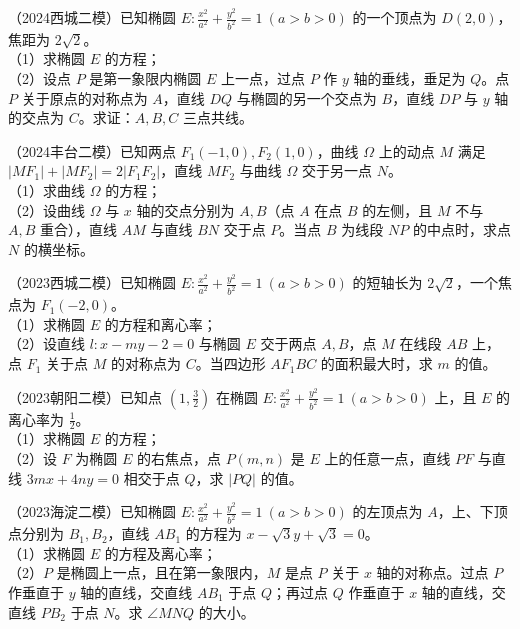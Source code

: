 \begin{example} %
（2024西城二模）已知椭圆 $E:\frac{x^2}{a^2}+\frac{y^2}{b^2}=1\ (a>b>0)$ 的一个顶点为 $D(2,0)$，焦距为 $2\sqrt{2}$。\\
（1）求椭圆 $E$ 的方程；\\
（2）设点 $P$ 是第一象限内椭圆 $E$ 上一点，过点 $P$ 作 $y$ 轴的垂线，垂足为 $Q$。点 $P$ 关于原点的对称点为 $A$，直线 $DQ$ 与椭圆的另一个交点为 $B$，直线 $DP$ 与 $y$ 轴的交点为 $C$。求证：$A,B,C$ 三点共线。
\end{example}

\begin{example} %
（2024丰台二模）已知两点 $F_1(-1,0),F_2(1,0)$，曲线 $\Omega$ 上的动点 $M$ 满足 $\lvert MF_1\rvert+\lvert MF_2\rvert=2\lvert F_1F_2\rvert$，直线 $MF_2$ 与曲线 $\Omega$ 交于另一点 $N$。\\
（1）求曲线 $\Omega$ 的方程；\\
（2）设曲线 $\Omega$ 与 $x$ 轴的交点分别为 $A,B$（点 $A$ 在点 $B$ 的左侧，且 $M$ 不与 $A,B$ 重合），直线 $AM$ 与直线 $BN$ 交于点 $P$。当点 $B$ 为线段 $NP$ 的中点时，求点 $N$ 的横坐标。
\end{example}

\begin{example} %
（2023西城二模）已知椭圆 $E:\frac{x^2}{a^2}+\frac{y^2}{b^2}=1\ (a>b>0)$ 的短轴长为 $2\sqrt{2}$，一个焦点为 $F_1(-2,0)$。\\
（1）求椭圆 $E$ 的方程和离心率；\\
（2）设直线 $l:x-my-2=0$ 与椭圆 $E$ 交于两点 $A,B$，点 $M$ 在线段 $AB$ 上，点 $F_1$ 关于点 $M$ 的对称点为 $C$。当四边形 $AF_1BC$ 的面积最大时，求 $m$ 的值。
\end{example}

\begin{example} %
（2023朝阳二模）已知点 $\left(1,\frac{3}{2}\right)$ 在椭圆 $E:\frac{x^2}{a^2}+\frac{y^2}{b^2}=1\ (a>b>0)$ 上，且 $E$ 的离心率为 $\frac{1}{2}$。\\
（1）求椭圆 $E$ 的方程；\\
（2）设 $F$ 为椭圆 $E$ 的右焦点，点 $P(m,n)$ 是 $E$ 上的任意一点，直线 $PF$ 与直线 $3mx+4ny=0$ 相交于点 $Q$，求 $\lvert PQ\rvert$ 的值。
\end{example}

\begin{example} %
（2023海淀二模）已知椭圆 $E:\frac{x^2}{a^2}+\frac{y^2}{b^2}=1\ (a>b>0)$ 的左顶点为 $A$，上、下顶点分别为 $B_1,B_2$，直线 $AB_1$ 的方程为 $x-\sqrt{3}y+\sqrt{3}=0$。\\
（1）求椭圆 $E$ 的方程及离心率；\\
（2）$P$ 是椭圆上一点，且在第一象限内，$M$ 是点 $P$ 关于 $x$ 轴的对称点。过点 $P$ 作垂直于 $y$ 轴的直线，交直线 $AB_1$ 于点 $Q$；再过点 $Q$ 作垂直于 $x$ 轴的直线，交直线 $PB_2$ 于点 $N$。求 $\angle MNQ$ 的大小。
\end{example}


